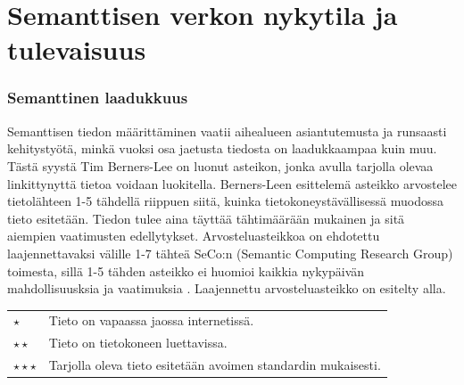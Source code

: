 \documentclass[finnish, 12pt, a4paper, elec, utf8, pdfa, online]{aaltothesis}
\begin{document}
{%

\clearpage
\section{Semanttisen verkon nykytila ja tulevaisuus}






\subsubsection{Semanttinen laadukkuus} %
Semanttisen tiedon määrittäminen vaatii aihealueen asiantutemusta ja runsaasti kehitystyötä, minkä vuoksi osa jaetusta tiedosta on laadukkaampaa kuin muu. Tästä syystä Tim Berners-Lee on luonut asteikon, jonka avulla tarjolla olevaa linkittynyttä tietoa voidaan luokitella. Berners-Leen esittelemä asteikko arvostelee tietolähteen 1-5 tähdellä riippuen siitä, kuinka tietokoneystävällisessä muodossa tieto esitetään. Tiedon tulee aina täyttää tähtimäärään mukainen ja sitä aiempien vaatimusten edellytykset. Arvosteluasteikkoa on ehdotettu laajennettavaksi välille 1-7 tähteä SeCo:n (Semantic Computing Research Group) toimesta, sillä 1-5 tähden asteikko ei huomioi kaikkia nykypäivän mahdollisuusksia ja vaatimuksia \cite{SeCo_stars}. Laajennettu arvosteluasteikko on esitelty alla.

\begin{tabular}{ll}
\vspace*{0.2cm}
$\star$                     & Tieto on vapaassa jaossa internetissä. \\
\vspace*{0.2cm}
$\star \star$                & Tieto on tietokoneen luettavissa. \\
\vspace*{0.2cm}
$\star\star\star$           & Tarjolla oleva tieto esitetään avoimen standardin mukaisesti. \\


\end{tabular}}
\end{document}
